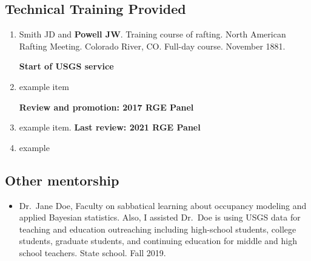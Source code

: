 \subsection{Technical Training Provided}\label{TTP}

\begin{enumerate}
\item Smith JD and \textbf{Powell JW}. Training course of rafting. North American Rafting Meeting. Colorado River, CO. Full-day course. November 1881.

  \noindent\makebox[\linewidth]{\rule{\textwidth}{1pt}} 
  \textbf{Start of USGS service}

\item example item

  \noindent\makebox[\linewidth]{\rule{\textwidth}{1pt}} 
  \textbf{Review and promotion: 2017 RGE Panel} 

\item example item.
  \noindent\makebox[\linewidth]{\rule{\textwidth}{1pt}} 
  \textbf{Last review: 2021 RGE Panel} 

\item example 
   
\end{enumerate}

\subsection{Other mentorship}\label{mentor:other}

\begin{itemize}
\item Dr.~Jane Doe,
  Faculty on sabbatical learning about occupancy modeling and applied
  Bayesian statistics.
  Also, I assisted Dr.~Doe is using USGS data for teaching and
  education outreaching including high-school students, college
  students, graduate students, and continuing education for middle and
  high school teachers.
  State school.
  Fall 2019.
 
\end{itemize}

